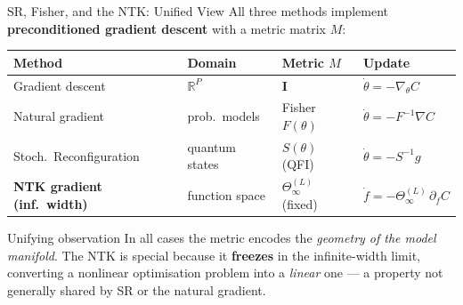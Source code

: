 \documentclass[aspectratio=169, 10pt]{beamer}
\newcommand{\NTK}{\Theta^{(L)}_\infty}
\newcommand{\R}{\mathbb{R}}
\newcommand{\highlight}[1]{\textcolor{blue!70!black}{\textbf{#1}}}
\begin{document}
\begin{frame}{SR, Fisher, and the NTK: Unified View}
  All three methods implement \textbf{preconditioned gradient descent} with a metric matrix $M$:

  \vspace{0.3em}
  \renewcommand{\arraystretch}{1.5}
  \begin{tabular}{llll}
    \toprule
    \textbf{Method} & \textbf{Domain} & \textbf{Metric $M$} & \textbf{Update} \\
    \midrule
    Gradient descent & $\R^P$ & $\mathbf{I}$ & $\dot\theta = -\nabla_\theta C$ \\
    Natural gradient & prob.\ models & Fisher $F(\theta)$ & $\dot\theta = -F^{-1}\nabla C$ \\
    Stoch.\ Reconfiguration & quantum states & $S(\theta)$ (QFI) & $\dot\theta = -S^{-1} g$ \\
    \highlight{NTK gradient (inf.\ width)} & function space & $\NTK$ (fixed) & $\dot f = -\NTK\,\partial_f C$ \\
    \bottomrule
  \end{tabular}

  \vspace{0.5em}
  \begin{block}{Unifying observation}
    In all cases the metric encodes the \emph{geometry of the model manifold}. The NTK is special because it \textbf{freezes} in the infinite-width limit, converting a nonlinear optimisation problem into a \emph{linear} one — a property not generally shared by SR or the natural gradient.
  \end{block}
\end{frame}
\end{document}
